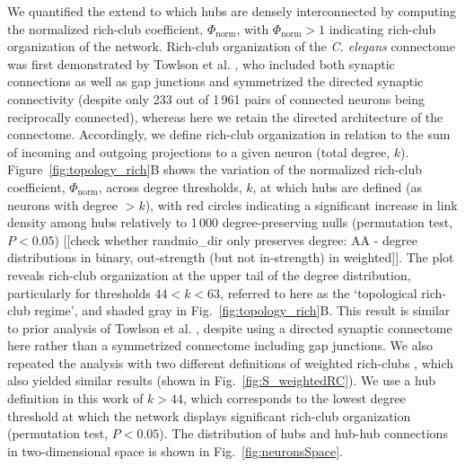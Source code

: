 \documentclass[10pt,letterpaper]{article}
\begin{document}
We quantified the extend to which hubs are densely interconnected by computing the normalized rich-club coefficient, $\Phi_\mathrm{norm}$, with $\Phi_\mathrm{norm} > 1$ indicating rich-club organization of the network.
Rich-club organization of the \emph{C. elegans} connectome was first demonstrated by Towlson et al. \cite{Towlson:2013gf}, who included both synaptic connections as well as gap junctions and symmetrized the directed synaptic connectivity (despite only 233 out of 1\,961 pairs of connected neurons being reciprocally connected), whereas here we retain the directed architecture of the connectome.
Accordingly, we define rich-club organization in relation to the sum of incoming and outgoing projections to a given neuron (total degree, $k$).
Figure~\ref{fig:topology_rich}B shows the variation of the normalized rich-club coefficient, $\Phi_\mathrm{norm}$, across degree thresholds, $k$, at which hubs are defined (as neurons with degree $>k$), with red circles indicating a significant increase in link density among hubs relatively to 1\,000 degree-preserving nulls (permutation test, $P < 0.05$) [[check whether randmio\_dir only preserves degree: AA - degree distributions in binary, out-strength (but not in-strength) in weighted]].
The plot reveals rich-club organization at the upper tail of the degree distribution, particularly for thresholds $44 < k < 63$, referred to here as the `topological rich-club regime', and shaded gray in Fig.~\ref{fig:topology_rich}B.
This result is similar to prior analysis of Towlson et al. \cite{Towlson:2013gf}, despite using a directed synaptic connectome here rather than a symmetrized connectome including gap junctions.
We also repeated the analysis with two different definitions of weighted rich-clubs \cite{Opsahl2008}, which also yielded similar results (shown in Fig.~\ref{fig:S_weightedRC}).
We use a hub definition in this work of $k > 44$, which corresponds to the lowest degree threshold at which the network displays significant rich-club organization (permutation test, $P < 0.05$).
The distribution of hubs and hub-hub connections in two-dimensional space is shown in Fig.~\ref{fig:neuronsSpace}.
\end{document}
